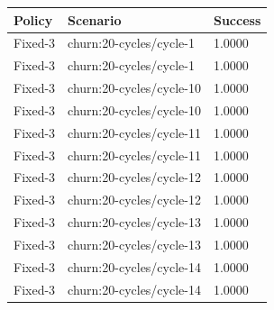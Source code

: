 \begin{tabular}{lll}
\hline
Policy & Scenario & Success \\
\hline
Fixed-3 & churn:20-cycles/cycle-1 & 1.0000 \\
Fixed-3 & churn:20-cycles/cycle-1 & 1.0000 \\
Fixed-3 & churn:20-cycles/cycle-10 & 1.0000 \\
Fixed-3 & churn:20-cycles/cycle-10 & 1.0000 \\
Fixed-3 & churn:20-cycles/cycle-11 & 1.0000 \\
Fixed-3 & churn:20-cycles/cycle-11 & 1.0000 \\
Fixed-3 & churn:20-cycles/cycle-12 & 1.0000 \\
Fixed-3 & churn:20-cycles/cycle-12 & 1.0000 \\
Fixed-3 & churn:20-cycles/cycle-13 & 1.0000 \\
Fixed-3 & churn:20-cycles/cycle-13 & 1.0000 \\
Fixed-3 & churn:20-cycles/cycle-14 & 1.0000 \\
Fixed-3 & churn:20-cycles/cycle-14 & 1.0000 \\
\hline
\end{tabular}
